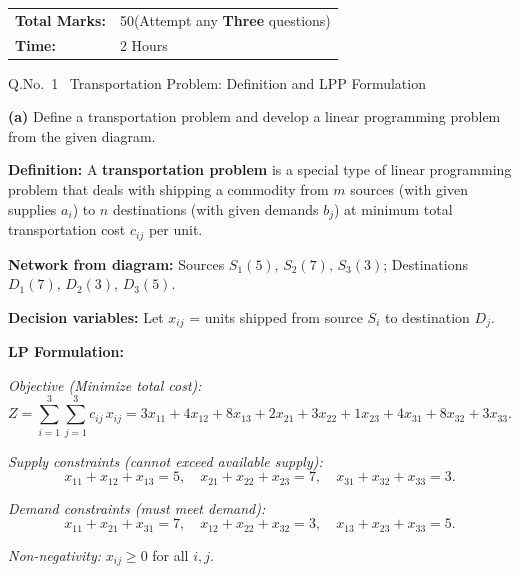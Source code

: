 \documentclass[12pt]{article}
\begin{document}
\vspace{16pt}
\begin{tcolorbox}[colback=lightbg,colframe=accent,arc=4pt,boxrule=1pt,
  left=12pt,right=12pt,top=10pt,bottom=10pt]
\begin{tabular}{ll}
  \textcolor{accent}{\bfseries Total Marks:}&50\quad(Attempt any \textbf{Three} questions)\\
  \textcolor{accent}{\bfseries Time:}&2 Hours\\
\end{tabular}
\end{tcolorbox}

\newpage

\begin{qbox}{Q.No.\ 1 \textemdash\ Transportation Problem: Definition and LPP Formulation}
\end{qbox}

\medskip
\textbf{(a)} Define a transportation problem and develop a linear programming problem from the given diagram.

\begin{ansbox}
\textbf{Definition:} A \textbf{transportation problem} is a special type of linear programming problem that deals with shipping a commodity from $m$ sources (with given supplies $a_i$) to $n$ destinations (with given demands $b_j$) at minimum total transportation cost $c_{ij}$ per unit.

\medskip
\textbf{Network from diagram:} Sources $S_1(5),\,S_2(7),\,S_3(3)$; Destinations $D_1(7),\,D_2(3),\,D_3(5)$.

\medskip
\textbf{Decision variables:} Let $x_{ij}$ = units shipped from source $S_i$ to destination $D_j$.

\medskip
\textbf{LP Formulation:}

\textit{Objective (Minimize total cost):}
\[
  Z = \sum_{i=1}^{3}\sum_{j=1}^{3} c_{ij}\,x_{ij}
  = 3x_{11}+4x_{12}+8x_{13}+2x_{21}+3x_{22}+1x_{23}+4x_{31}+8x_{32}+3x_{33}.
\]

\textit{Supply constraints (cannot exceed available supply):}
\[
  x_{11}+x_{12}+x_{13}=5,\quad x_{21}+x_{22}+x_{23}=7,\quad x_{31}+x_{32}+x_{33}=3.
\]

\textit{Demand constraints (must meet demand):}
\[
  x_{11}+x_{21}+x_{31}=7,\quad x_{12}+x_{22}+x_{32}=3,\quad x_{13}+x_{23}+x_{33}=5.
\]

\textit{Non-negativity:} $x_{ij}\geq0$ for all $i,j$.
\end{ansbox}
\end{document}
